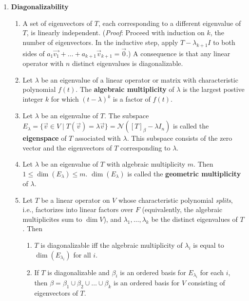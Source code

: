 \documentclass[10pt]{article}
\begin{document}
\begin{multicols*}{2}
\begin{enumerate}
    \item \textbf{Diagonalizability}
    \begin{enumerate}
        \item A set of eigenvectors of $T$, each corresponding to a different eigenvalue of $T$, is linearly independent. (\textit{Proof}: Proceed with induction on $k$, the number of eigenvectors. In the inductive step, apply $T-\lambda_{k+1}I$ to both sides of $a_1\vec{v_1} + \hdots + a_{k+1}\vec{v}_{k+1} = \vec{0}$.) A consequence is that any linear operator with $n$ distinct eigenvalues is diagonalizable. 
        \item Let $\lambda$ be an eigenvalue of a linear operator or matrix with characteristic polynomial $f(t)$. The \textbf{algebraic multiplicity} of $\lambda$ is the largest postive integer $k$ for which $(t-\lambda)^k$ is a factor of $f(t)$.
        \item Let $\lambda$ be an eigenvalue of $T$. The subspace $E_\lambda = \{ \vec{v} \in V \mid T(\vec{v}) = \lambda \vec{v} \} = \mathcal{N}([T]_\beta - \lambda I_n)$ is called the \textbf{eigenspace} of $T$ associated with $\lambda$. This subspace consists of the zero vector and the eigenvectors of $T$ corresponding to $\lambda$. 
        \item Let $\lambda$ be an eigenvalue of $T$ with algebraic multiplicity $m$. Then $1 \leq \dim(E_\lambda) \leq m$. $\dim(E_\lambda)$ is called the \textbf{geometric multiplicity} of $\lambda$.
        \item Let $T$ be a linear operator on $V$ whose characteristic polynomial \textit{splits}, i.e., factorizes into linear factors over $F$ (equivalently, the algebraic multiplicites sum to $\dim{V}$), and $\lambda_1, \hdots, \lambda_k$ be the distinct eigenvalues of $T$. Then
        \begin{enumerate}
            \item $T$ is diagonalizable iff the algebraic multiplicity of $\lambda_i$ is equal to $\dim(E_{\lambda_i})$ for all $i$.
            \item If $T$ is diagonalizable and $\beta_i$ is an ordered basis for $E_{\lambda_i}$ for each $i$, then $\beta = \beta_1 \cup \beta_2 \cup \hdots \cup \beta_k$ is an ordered basis for $V$ consisting of eigenvectors of $T$.
        \end{enumerate}
        

\end{enumerate}
\end{enumerate}
\end{multicols*}
\end{document}

